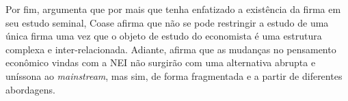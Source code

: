 \documentclass[9pt,twocolumn,twoside,lineno]{style}
\begin{document}
Por fim, argumenta que por mais que tenha enfatizado a existência da firma em seu estudo seminal, Coase afirma que não se pode restringir a estudo de uma única firma uma vez que o objeto de estudo do economista é uma estrutura complexa e inter-relacionada. Adiante, afirma que as mudanças no pensamento econômico vindas com a NEI não surgirão com uma alternativa abrupta e uníssona ao \textit{mainstream}, mas sim, de forma fragmentada e a partir de diferentes abordagens.
\end{document}
